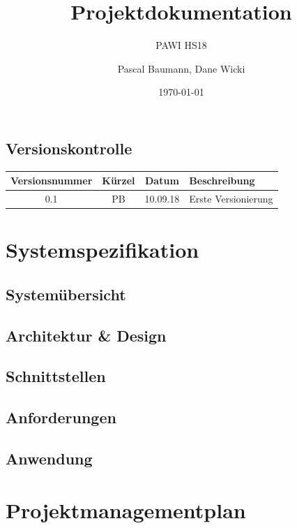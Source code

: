 \documentclass[a4paper]{scrreprt}
\title{Projektdokumentation}
\subtitle{PAWI HS18}
\author{Pascal Baumann, Dane Wicki}
\date{\today}
\begin{document}
\begin{titlepage}
\maketitle
\end{titlepage}

\section*{Versionskontrolle}

\begin{tabularx}{\textwidth}{|c|c|c|X|}
	\hline 
	\textbf{Versionsnummer} & \textbf{Kürzel} & \textbf{Datum} & \textbf{Beschreibung} \\ 
	\hline 
	0.1 & PB & 10.09.18 & Erste Versionierung \\ 
	\hline 
\end{tabularx} 

\tableofcontents

\chapter{Systemspezifikation}

\section{Systemübersicht}

\section{Architektur \& Design}

\section{Schnittstellen}

\section{Anforderungen}

\section{Anwendung}

\chapter{Projektmanagementplan}
\end{document}
